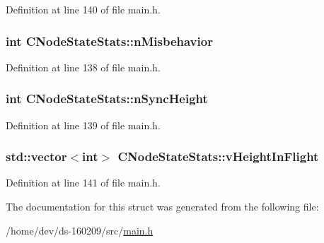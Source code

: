 Definition at line 140 of file main.\+h.

\hypertarget{struct_c_node_state_stats_a62c2243d09166c1daaad84519700da3c}{}
\subsubsection[{n\+Misbehavior}]{\setlength{\rightskip}{0pt plus 5cm}int C\+Node\+State\+Stats\+::n\+Misbehavior}\label{struct_c_node_state_stats_a62c2243d09166c1daaad84519700da3c}


Definition at line 138 of file main.\+h.

\hypertarget{struct_c_node_state_stats_a7646deac801098e973a5bc50202f92cd}{}
\subsubsection[{n\+Sync\+Height}]{\setlength{\rightskip}{0pt plus 5cm}int C\+Node\+State\+Stats\+::n\+Sync\+Height}\label{struct_c_node_state_stats_a7646deac801098e973a5bc50202f92cd}


Definition at line 139 of file main.\+h.

\hypertarget{struct_c_node_state_stats_a4b03fd8ecaa9268f7eca836e5e79c35a}{}
\subsubsection[{v\+Height\+In\+Flight}]{\setlength{\rightskip}{0pt plus 5cm}std\+::vector$<$int$>$ C\+Node\+State\+Stats\+::v\+Height\+In\+Flight}\label{struct_c_node_state_stats_a4b03fd8ecaa9268f7eca836e5e79c35a}


Definition at line 141 of file main.\+h.



The documentation for this struct was generated from the following file\+:\begin{DoxyCompactItemize}
\item 
/home/dev/ds-\/160209/src/\hyperlink{main_8h}{main.\+h}\end{DoxyCompactItemize}
